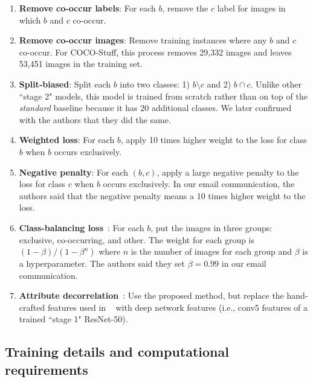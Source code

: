 \begin{enumerate} 
	\item \textbf{Remove co-occur labels}: For each $b$, remove the $c$ label for images in which $b$ and $c$ co-occur.
    \item \textbf{Remove co-occur images}: Remove training instances where any $b$ and $c$ co-occur. For COCO-Stuff, this process removes 29,332 images and leaves 53,451 images in the training set.
    \item \textbf{Split-biased}: Split each $b$ into two classes: 1) $b \setminus c$ and 2) $b \cap c$.  Unlike other ``stage 2" models, this model is trained from scratch rather than on top of the \textit{standard} baseline because it has 20 additional classes. We later confirmed with the authors that they did the same.
    \item \textbf{Weighted loss}: For each $b$, apply 10 times higher weight to the loss for class $b$ when $b$ occurs exclusively.
    \item \textbf{Negative penalty}: For each $(b, c)$, apply a large negative penalty to the loss for class $c$ when $b$ occurs exclusively. In our email communication, the authors said that the negative penalty means a 10 times higher weight to the loss.
    \item \textbf{Class-balancing loss}~\cite{Cui_2019_CVPR}: For each $b$, put the images in three groups: exclusive, co-occurring, and other. The weight for each group is $(1-\beta)/(1-\beta^n)$ where $n$ is the number of images for each group and $\beta$ is a hyperparameter. The authors said they set $\beta=0.99$ in our email communication.
    \item \textbf{Attribute decorrelation}~\cite{Jayaraman_2014_CVPR}: Use the proposed method, but replace the hand-crafted features used in ~\cite{Jayaraman_2014_CVPR} with deep network features (i.e., conv5 features of a trained ``stage 1" ResNet-50).
\end{enumerate}


\subsection{Training details and computational requirements}

